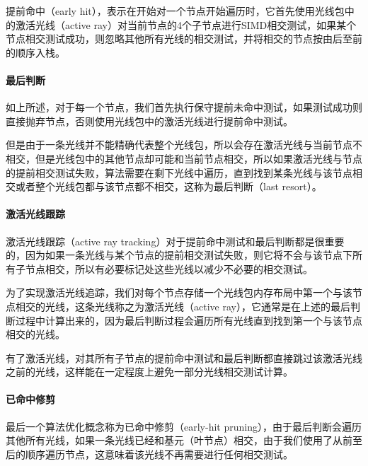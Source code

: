 提前命中（early hit），表示在开始对一个节点开始遍历时，它首先使用光线包中的激活光线（active ray）对当前节点的4个子节点进行SIMD相交测试，如果某个节点相交测试成功，则忽略其他所有光线的相交测试，并将相交的节点按由后至前的顺序入栈。




\paragraph{最后判断}
如上所述，对于每一个节点，我们首先执行保守提前未命中测试，如果测试成功则直接抛弃节点，否则使用光线包中的激活光线进行提前命中测试。

但是由于一条光线并不能精确代表整个光线包，所以会存在激活光线与当前节点不相交，但是光线包中的其他节点却可能和当前节点相交，所以如果激活光线与节点的提前相交测试失败，算法需要在剩下光线中遍历，直到找到某条光线与该节点相交或者整个光线包都与该节点都不相交，这称为最后判断（last resort）。






\paragraph{激活光线跟踪}
激活光线跟踪（active ray tracking）对于提前命中测试和最后判断都是很重要的，因为如果一条光线与某个节点的提前相交测试失败，则它将不会与该节点下所有子节点相交，所以有必要标记处这些光线以减少不必要的相交测试。

为了实现激活光线追踪，我们对每个节点存储一个光线包内存布局中第一个与该节点相交的光线，这条光线称之为激活光线（active ray），它通常是在上述的最后判断过程中计算出来的，因为最后判断过程会遍历所有光线直到找到第一个与该节点相交的光线。

有了激活光线，对其所有子节点的提前命中测试和最后判断都直接跳过该激活光线之前的光线，这样能在一定程度上避免一部分光线相交测试计算。





\paragraph{已命中修剪}
最后一个算法优化概念称为已命中修剪（early-hit pruning），由于最后判断会遍历其他所有光线，如果一条光线已经和基元（叶节点）相交，由于我们使用了从前至后的顺序遍历节点，这意味着该光线不再需要进行任何相交测试。

